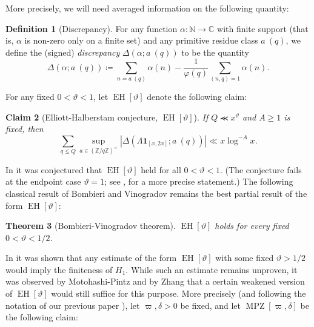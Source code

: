 \documentclass{bmcart}
\DeclareMathOperator*\EH{EH}
\DeclareMathOperator*\MPZ{MPZ}
\theoremstyle{plain}
\newtheorem{theorem}{Theorem}[section]
\newtheorem{claim}[theorem]{Claim}
\theoremstyle{definition}
\newtheorem{definition}[theorem]{Definition}
\newcommand\Z{\mathbb{Z}}
\newcommand\N{\mathbb{N}}
\newcommand\C{\mathbb{C}}
\renewcommand{\lessapprox}{\llcurly}
\renewcommand{\phi}{\varphi}
\newcommand{\onef}{\mathbf{1}}
\begin{document}
More precisely, we will need averaged information on the following quantity:

\begin{definition}[Discrepancy]
For any function $\alpha \colon \N \to \C$ with finite support (that is, $\alpha$ is non-zero only on a finite set) and any
primitive residue class $a\ (q)$, we define the (signed)
\emph{discrepancy} $\Delta(\alpha; a\ (q))$ to be the quantity
\begin{equation}\label{disc-def}
  \Delta(\alpha; a\ (q)) \coloneqq \sum_{n = a\ (q)} \alpha(n) - 
  \frac{1}{\phi(q)} \sum_{(n,q)=1} \alpha(n).
\end{equation}
\end{definition}

For any fixed $0 < \vartheta < 1$, let $\EH[\vartheta]$ denote the following claim:

\begin{claim}[Elliott-Halberstam conjecture, {$\EH[\vartheta]$}]\label{eh-def}  If $Q \lessapprox x^\vartheta$ and $A \geq 1$ is fixed, then
\begin{equation}\label{qq}
 \sum_{q \leq Q} \sup_{a \in (\Z/q\Z)^\times} |\Delta(\Lambda \onef_{[x,2x]}; a\ (q))| \ll x \log^{-A} x.
\end{equation} 
\end{claim}

In \cite{elliott} it was conjectured that $\EH[\vartheta]$ held for all $0 < \vartheta < 1$.  (The conjecture fails at the endpoint case $\vartheta=1$; see \cite{fg}, \cite{fghm} for a more precise statement.)  The following classical result of Bombieri \cite{bombieri} and Vinogradov \cite{vinogradov} remains the best partial result of the form $\EH[\vartheta]$:

\begin{theorem}[Bombieri-Vinogradov theorem]\label{bv-thm}\cite{bombieri,vinogradov}  $\EH[\vartheta]$ holds for every fixed $0 < \vartheta < 1/2$.
\end{theorem}

In \cite{gpy} it was shown that any estimate of the form $\EH[\vartheta]$ with some fixed $\vartheta > 1/2$ would imply the finiteness of $H_1$.  While such an estimate remains unproven, it was observed by Motohashi-Pintz \cite{mp} and by Zhang \cite{zhang} that a certain weakened version of $\EH[\vartheta]$ would still suffice for this purpose.  More precisely (and following the notation of our previous paper \cite{polymath8a}), let $\varpi,\delta > 0$ be fixed, and let $\MPZ[\varpi,\delta]$ be the following claim:
\end{document}
